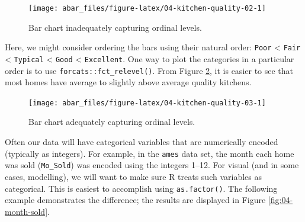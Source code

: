 \documentclass[]{book}
\newenvironment{Shaded}{\begin{snugshade}}{\end{snugshade}}
\newcommand{\DataTypeTok}[1]{\textcolor[rgb]{0.13,0.29,0.53}{#1}}
\newcommand{\KeywordTok}[1]{\textcolor[rgb]{0.13,0.29,0.53}{\textbf{#1}}}
\newcommand{\NormalTok}[1]{#1}
\newcommand{\OperatorTok}[1]{\textcolor[rgb]{0.81,0.36,0.00}{\textbf{#1}}}
\newcommand{\StringTok}[1]{\textcolor[rgb]{0.31,0.60,0.02}{#1}}
\theoremstyle{definition}
\theoremstyle{definition}
\theoremstyle{definition}
\theoremstyle{remark}
\begin{document}
\begin{figure}

{\centering \texttt{[image: abar\_files/figure-latex/04-kitchen-quality-02-1]} 

}

\caption{Bar chart inadequately capturing ordinal levels.}\label{fig:04-kitchen-quality-02}
\end{figure}

Here, we might consider ordering the bars using their natural order:
\texttt{Poor} \textless{} \texttt{Fair} \textless{} \texttt{Typical}
\textless{} \texttt{Good} \textless{} \texttt{Excellent}. One way to
plot the categories in a particular order is to use
\texttt{forcats::fct\_relevel()}. From Figure
\ref{fig:04-kitchen-quality-03}, it is easier to see that most homes
have average to slightly above average quality kitchens.

\begin{Shaded}
\end{Shaded}

\begin{figure}

{\centering \texttt{[image: abar\_files/figure-latex/04-kitchen-quality-03-1]} 

}

\caption{Bar chart adequately capturing ordinal levels.}\label{fig:04-kitchen-quality-03}
\end{figure}

Often our data will have categorical variables that are numerically
encoded (typically as integers). For example, in the \texttt{ames} data
set, the month each home was sold (\texttt{Mo\_Sold}) was encoded using
the integers 1--12. For visual (and in some cases, modelling), we will
want to make sure R treats such variables as categorical. This is
easiest to accomplish using \texttt{as.factor()}. The following example
demonstrates the difference; the results are displayed in Figure
\ref{fig:04-month-sold}.
\end{document}
